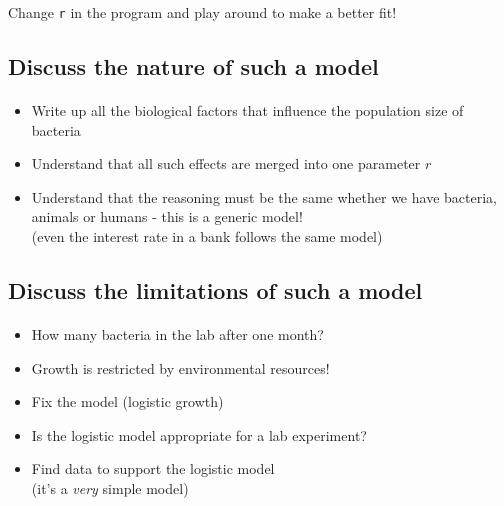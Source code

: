 \documentclass[%
twoside,                 %
final,                   %
10pt]{article}
\begin{document}
Change \Verb!r! in the program and play around to make a better fit!



\subsection*{Discuss the nature of such a model}


\paragraph{}
\begin{itemize}
 \item Write up all the biological factors that influence the
   population size of bacteria

 \item Understand that all such effects are merged into one parameter $r$

 \item Understand that the reasoning must be the same whether we
   have bacteria, animals or humans - this is a generic model!\\
   (even the interest rate in a bank follows the same model)
\end{itemize}

\noindent



\subsection*{Discuss the limitations of such a model}


\paragraph{}
\begin{itemize}
 \item How many bacteria in the lab after one month?

 \item Growth is restricted by environmental resources!

 \item Fix the model (logistic growth)

 \item Is the logistic model appropriate for a lab experiment?

 \item Find data to support the logistic model \\
   (it's a \emph{very} simple model)
\end{itemize}
\end{document}
